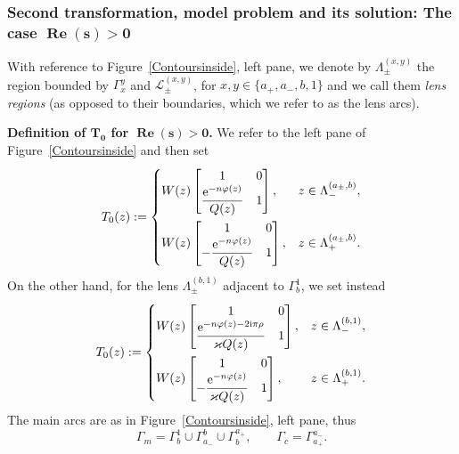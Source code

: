 \documentclass[10pt,a4paper]{amsart}
\numberwithin{equation}{section}
\theoremstyle{definition}
\def \scr{\mathscr}
\def \ds{\displaystyle}
\def\be{\begin{equation}}
\def\ee{\end{equation}}
\def \Re{\operatorname{Re} }
\begin{document}
\subsubsection[Second transformation, model problem and its solution: The case $\Re(s)>0$]{Second transformation, model problem and its solution: The case $\boldsymbol{\Re(s)>0}$}
\label{secmodels>0}

 With reference to Figure~\ref{Contoursinside}, left pane, we denote by $\Lambda_{\pm}^{(x,y)}$ the region bounded by $\Gamma_x^y$ and $\scr L_\pm^{(x,y)}$, for $x,y\in \{a_+,a_-,b,1\}$ and we call them {\it lens regions} (as opposed to their boundaries, which we refer to as the lens arcs).

{\bf Definition of $\boldsymbol{T_0}$ for $\boldsymbol{\Re(s)>0}$.}
We refer to the left pane of Figure~\ref{Contoursinside} and then set
\[
T_0(z):=
\begin{cases}
\ds W(z) \begin{bmatrix}
1 & 0 \\
\displaystyle\frac{ {\rm e}^{-n\varphi(z)}}{ Q(z)} & 1
\end{bmatrix},& z\in \Lambda_-^{(a_\pm,b)},
\vspace{1mm}\\
W(z) \begin{bmatrix}
1 & 0 \\
\displaystyle-\frac{ {\rm e}^{-n\varphi(z)}}{ Q(z)} & 1
\end{bmatrix},& z\in \Lambda_+^{(a_\pm,b)}.
\end{cases}
\]
 On the other hand, for the lens $\Lambda_\pm^{(b,1)}$ adjacent to $\Gamma_b^1$, we set instead
\be
\label{defTb1}
T_0(z):=
\begin{cases}
\ds W(z) \begin{bmatrix}
1 & 0 \\
\displaystyle\frac{ {\rm e}^{-n\varphi(z)-2{\rm i}\pi { {\rho}}}}{\varkappa Q(z)} & 1
\end{bmatrix},& z\in \Lambda_-^{(b,1)},
\vspace{1mm}\\
W(z) \begin{bmatrix}
1 & 0 \\
\displaystyle-\frac{ {\rm e}^{-n\varphi(z)}}{\varkappa Q(z)} & 1
\end{bmatrix}, & z\in \Lambda_+^{(b,1)}.
\end{cases}
\ee
The main arcs are as in Figure~\ref{Contoursinside}, left pane, thus
\[
\Gamma_m = \Gamma_b^1 \cup \Gamma_{a_-}^b \cup \Gamma_{b}^{a_+}, \qquad
\Gamma_c = \Gamma_{a_+}^{a_-}.
\]
\end{document}
